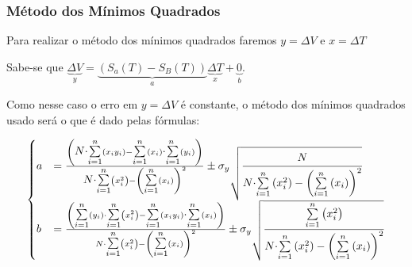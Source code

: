 \documentclass[a4paper]{article}
\begin{document}
		\subsubsection{Método dos Mínimos Quadrados}

			Para realizar o método dos mínimos quadrados faremos $y=\Delta V$ e $x=\Delta T$

			Sabe-se que $\underset{y}{\underbrace{\Delta V}}=\underset{a}{\underbrace{\left(S_{a}(T)-S_{B}(T)\right)}}\underset{x}{\underbrace{\Delta T}}+\underset{b}{\underbrace{0}}$.

			Como nesse caso o erro em $y=\Delta V$ é constante, o método dos
			mínimos quadrados usado será o que é dado pelas fórmulas:

			\[
			\begin{cases}
				a & =\frac{\left({\displaystyle {\displaystyle N\cdot}{\scriptscriptstyle {\textstyle \overset{n}{\underset{i=1}{\sum}}}}}\left(x_{i}y_{i}\right)-{\displaystyle {\scriptscriptstyle {\textstyle \overset{n}{\underset{i=1}{\sum}}}}}\left(x_{i}\right){\scriptscriptstyle {\textstyle \overset{n}{\cdot\underset{i=1}{\sum}}}}\left(y_{i}\right)\right)}{{\displaystyle {\displaystyle N\cdot}{\scriptscriptstyle {\textstyle \overset{n}{\underset{i=1}{\sum}}}}}\left(x_{i}^{2}\right)-\left({\displaystyle {\scriptscriptstyle {\textstyle \overset{n}{\underset{i=1}{\sum}}}}}\left(x_{i}\right)\right)^{2}}\pm\sigma_{y}\sqrt{\cfrac{{\displaystyle {\displaystyle {\displaystyle N}}}}{{\displaystyle {\displaystyle N\cdot}{\scriptscriptstyle {\textstyle \overset{n}{\underset{i=1}{\sum}}}}}\left(x_{i}^{2}\right)-\left({\displaystyle {\scriptscriptstyle {\textstyle \overset{n}{\underset{i=1}{\sum}}}}}\left(x_{i}\right)\right)^{2}}}\\
				b & =\frac{\left({\displaystyle {\scriptscriptstyle {\textstyle \overset{n}{\underset{i=1}{\sum}}}}}\left(y_{i}\right)\cdot{\displaystyle {\scriptscriptstyle {\textstyle \overset{n}{\underset{i=1}{\sum}}}}}\left(x_{i}^{2}\right)-{\displaystyle {\scriptscriptstyle {\textstyle \overset{n}{\underset{i=1}{\sum}}}}}\left(x_{i}y_{i}\right){\scriptscriptstyle {\textstyle \overset{n}{\cdot\underset{i=1}{\sum}}}}\left(x_{i}\right)\right)}{N\cdot{\displaystyle {\scriptscriptstyle {\textstyle \overset{n}{\underset{i=1}{\sum}}}}}\left(x_{i}^{2}\right)-\left({\displaystyle {\scriptscriptstyle {\textstyle \overset{n}{\underset{i=1}{\sum}}}}}\left(x_{i}\right)\right)^{2}}\pm\sigma_{y}\sqrt{\cfrac{{\displaystyle {\scriptscriptstyle {\textstyle \overset{n}{\underset{i=1}{\sum}}}}}\left(x_{i}^{2}\right)}{{\displaystyle {\displaystyle N\cdot}{\scriptscriptstyle {\textstyle \overset{n}{\underset{i=1}{\sum}}}}}\left(x_{i}^{2}\right)-\left({\displaystyle {\scriptscriptstyle {\textstyle \overset{n}{\underset{i=1}{\sum}}}}}\left(x_{i}\right)\right)^{2}}}
			\end{cases}
			\]
\end{document}

